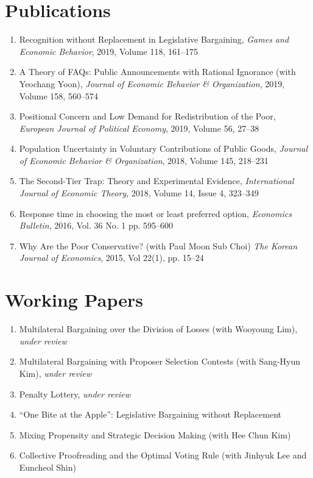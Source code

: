 \documentclass[margin, letterpaper]{res}
\begin{document}
\begin{resume}
\section{Publications}
\begin{enumerate}
\item Recognition without Replacement in Legislative Bargaining, \emph{Games and Economic Behavior}, 2019, Volume 118, 161--175
\item A Theory of FAQs: Public Announcements with Rational Ignorance (with Yeochang Yoon), \emph{Journal of Economic Behavior \& Organization}, 2019, Volume 158, 560--574
\item Positional Concern and Low Demand for Redistribution of the Poor, \emph{European Journal of Political Economy}, 2019, Volume 56, 27--38
\item Population Uncertainty in Voluntary Contributions of Public Goods, \emph{Journal of Economic Behavior \& Organization}, 2018, Volume 145, 218--231
\item The Second-Tier Trap: Theory and Experimental Evidence, \emph{International Journal of Economic Theory}, 2018, Volume 14, Issue 4, 323--349
\item Response time in choosing the most or least preferred option, \textit{Economics Bulletin}, 2016, Vol. 36 No. 1 pp. 595--600
\item Why Are the Poor Conservative? (with Paul Moon Sub Choi) \textit{The Korean Journal of Economics}, 2015, Vol 22(1), pp. 15--24
\end{enumerate}

\section{Working Papers}
\begin{enumerate}
\item Multilateral Bargaining over the Division of Losses (with Wooyoung Lim), \emph{under review}
\item Multilateral Bargaining with Proposer Selection Contests (with Sang-Hyun Kim), \emph{under review}
\item Penalty Lottery, \emph{under review}
\item ``One Bite at the Apple'': Legislative Bargaining without Replacement
\item Mixing Propensity and Strategic Decision Making (with Hee Chun Kim)
\item Collective Proofreading and the Optimal Voting Rule (with Jinhyuk Lee and Euncheol Shin)
\end{enumerate}


\end{resume}
\end{document}
